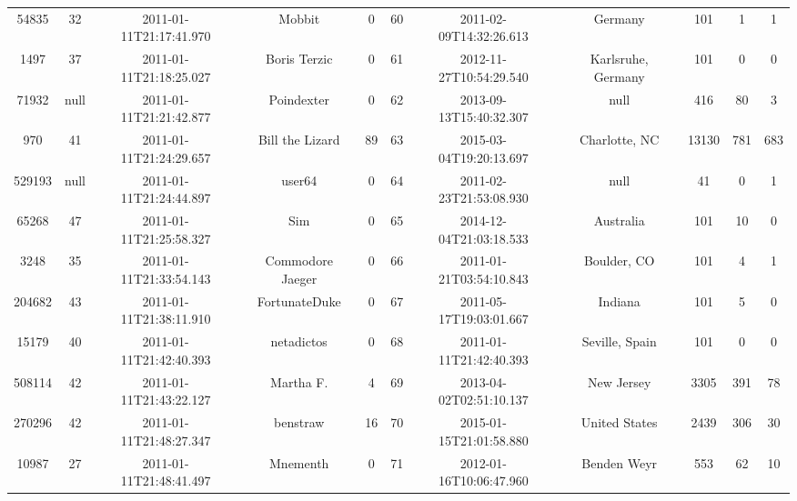 \documentclass[12pt,a4paper,twoside,openright,titlepage,final]{article}
\begin{document}
\begin{enumerate}
\begin{table}[htbp!]
{\begin{tabular}{@{}ccccccccccc@{}}
			54835     & 32   & 2011-01-11T21:17:41.970 & Mobbit                & 0         & 60    & 2011-02-09T14:32:26.613 & Germany                          & 101        & 1       & 1     \\
			1497      & 37   & 2011-01-11T21:18:25.027 & Boris Terzic          & 0         & 61    & 2012-11-27T10:54:29.540 & Karlsruhe, Germany               & 101        & 0       & 0     \\
			71932     & null & 2011-01-11T21:21:42.877 & Poindexter            & 0         & 62    & 2013-09-13T15:40:32.307 & null                             & 416        & 80      & 3     \\
			970       & 41   & 2011-01-11T21:24:29.657 & Bill the Lizard       & 89        & 63    & 2015-03-04T19:20:13.697 & Charlotte, NC                    & 13130      & 781     & 683   \\
			529193    & null & 2011-01-11T21:24:44.897 & user64                & 0         & 64    & 2011-02-23T21:53:08.930 & null                             & 41         & 0       & 1     \\
			65268     & 47   & 2011-01-11T21:25:58.327 & Sim                   & 0         & 65    & 2014-12-04T21:03:18.533 & Australia                        & 101        & 10      & 0     \\
			3248      & 35   & 2011-01-11T21:33:54.143 & Commodore Jaeger      & 0         & 66    & 2011-01-21T03:54:10.843 & Boulder, CO                      & 101        & 4       & 1     \\
			204682    & 43   & 2011-01-11T21:38:11.910 & FortunateDuke         & 0         & 67    & 2011-05-17T19:03:01.667 & Indiana                          & 101        & 5       & 0     \\
			15179     & 40   & 2011-01-11T21:42:40.393 & netadictos            & 0         & 68    & 2011-01-11T21:42:40.393 & Seville, Spain                   & 101        & 0       & 0     \\
			508114    & 42   & 2011-01-11T21:43:22.127 & Martha F.             & 4         & 69    & 2013-04-02T02:51:10.137 & New Jersey                       & 3305       & 391     & 78    \\
			270296    & 42   & 2011-01-11T21:48:27.347 & benstraw              & 16        & 70    & 2015-01-15T21:01:58.880 & United States                    & 2439       & 306     & 30    \\
			10987     & 27   & 2011-01-11T21:48:41.497 & Mnementh              & 0         & 71    & 2012-01-16T10:06:47.960 & Benden Weyr                      & 553        & 62      & 10    \\

\end{tabular}}
\end{table}
\end{enumerate}
\end{document}

